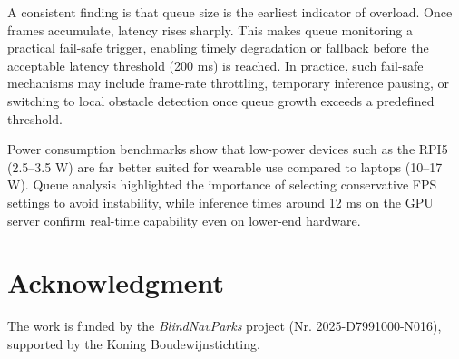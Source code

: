 \documentclass{ieeeaccess}
\begin{document}
A consistent finding is that queue size is the earliest indicator of overload. Once frames accumulate, latency rises sharply. This makes queue monitoring a practical fail-safe trigger, enabling timely degradation or fallback before the acceptable latency threshold (200 ms) is reached. In practice, such fail-safe mechanisms may include frame-rate throttling, temporary inference pausing, or switching to local obstacle detection once queue growth exceeds a predefined threshold.

Power consumption benchmarks show that low-power devices such as the RPI5 (2.5–3.5 W) are far better suited for wearable use compared to laptops (10–17 W). Queue analysis highlighted the importance of selecting conservative FPS settings to avoid instability, while inference times around 12 ms on the GPU server confirm real-time capability even on lower-end hardware.  




\section*{Acknowledgment}
The work is funded by the \textit{BlindNavParks} project (Nr. 2025-D7991000-N016), supported by the Koning Boudewijnstichting.

\appendices
\end{document}

